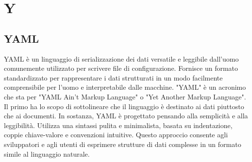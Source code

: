 \section{Y}

\vspace{2em}
\subsection*{YAML}
YAML è un linguaggio di serializzazione dei dati versatile e leggibile dall'uomo comunemente utilizzato per scrivere file di configurazione.
Fornisce un formato standardizzato per rappresentare i dati strutturati in un modo facilmente comprensibile per l'uomo e interpretabile dalle macchine. "YAML" è un acronimo che sta per "YAML Ain't Markup Language" o "Yet Another Markup Language". Il primo ha lo scopo di sottolineare che il linguaggio è destinato ai dati piuttosto che ai documenti.
In sostanza, YAML è progettato pensando alla semplicità e alla leggibilità. Utilizza una sintassi pulita e minimalista, basata su indentazione, coppie chiave-valore e convenzioni intuitive. Questo approccio consente agli sviluppatori e agli utenti di esprimere strutture di dati complesse in un formato simile al linguaggio naturale.
